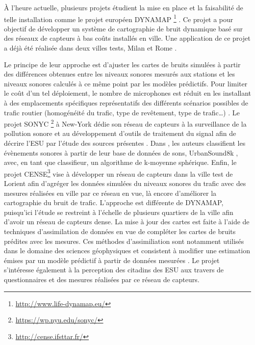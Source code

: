 \`A l'heure actuelle, plusieurs projets étudient la mise en place et la faisabilité de telle installation comme le projet européen DYNAMAP \footnote{\url{http://www.life-dynamap.eu/}} \cite{dynamap_2016}. Ce projet a pour objectif de développer un système de cartographie de bruit dynamique basé sur des réseaux de capteurs à bas coûts installés en ville. Une application de ce projet a déjà été réalisée dans deux villes tests, Milan et Rome \cite{bellucci_life_2017}. 

Le principe de leur approche est d'ajuster les cartes de bruits simulées à partir des différences obtenues entre les niveaux sonores mesurés aux stations et les niveaux sonores calculés à ce même point par les modèles prédictifs. Pour limiter le coût d'un tel déploiement, le nombre de microphones est réduit en les installant à des emplacements spécifiques représentatifs des différents scénarios possibles de trafic routier (homogénéité du trafic, type de revêtement, type de trafic\dots) \cite{zambon2017life}.
Le projet SONYC \footnote{\url{https://wp.nyu.edu/sonyc/}} à New-York dédie son réseau de capteurs à la surveillance de la pollution sonore et au développement d'outils de traitement du signal afin de décrire l'ESU par l'étude des sources présentes \cite{mydlarz2017noise}. Dans \cite{salamon2015unsupervised}, les auteurs classifient les évènements sonores à partir de leur base de données de sons, UrbanSound8k \cite{salamon_dataset_nodate}, avec, en tant que classifieur, un algorithme de k-moyenne sphérique.
Enfin, le projet CENSE\footnote{\url{http://cense.ifsttar.fr/}} vise à développer un réseau de capteurs dans la ville test de Lorient afin d'agréger les données simulées du niveaux sonores du trafic avec des mesures réalisées en ville par ce réseau en vue, là encore d'améliorer la cartographie du bruit de trafic. L'approche est différente de DYNAMAP, puisqu'ici l'étude se restreint à l'échelle de plusieurs quartiers de la ville afin d'avoir un réseau de capteurs dense. La mise à jour des cartes est faite à l'aide de techniques d'assimilation de données en vue de compléter les cartes de bruits prédites avec les mesures. 
Ces méthodes d'assimiliation sont notamment utilisés dans le domaine des sciences géophysiques et consistent à modifier une estimation émises par un modèle prédictif à partir de données mesurées \cite{wu2008comparison}.
Le projet s'intéresse également à la perception des citadins des ESU aux travers de questionnaires et des mesures réalisées par ce réseau de capteurs.
 
